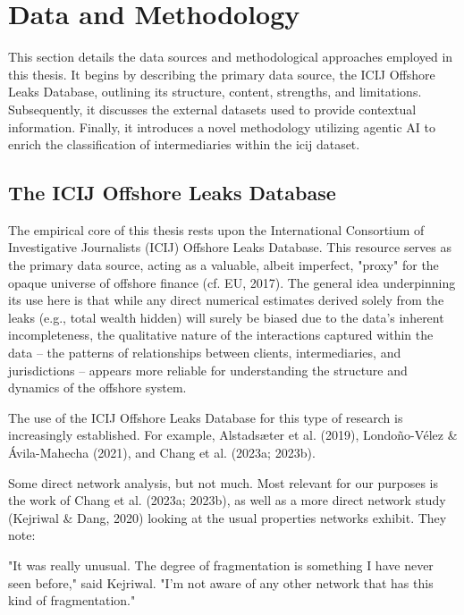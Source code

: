 \chapter{Data and Methodology}
\label{chap:data_methodology}

This section details the data sources and methodological approaches employed in this thesis. It begins by describing the primary data source, the ICIJ Offshore Leaks Database, outlining its structure, content, strengths, and limitations. Subsequently, it discusses the external datasets used to provide contextual information. Finally, it introduces a novel methodology utilizing agentic AI to enrich the classification of intermediaries within the icij dataset.

\section{The ICIJ Offshore Leaks Database}
\label{sec:3_1}

The empirical core of this thesis rests upon the International Consortium of Investigative Journalists (ICIJ) Offshore Leaks Database. This resource serves as the primary data source, acting as a valuable, albeit imperfect, "proxy" for the opaque universe of offshore finance (cf. EU, 2017). The general idea underpinning its use here is that while any direct numerical estimates derived solely from the leaks (e.g., total wealth hidden) will surely be biased due to the data's inherent incompleteness, the qualitative nature of the interactions captured within the data – the patterns of relationships between clients, intermediaries, and jurisdictions – appears more reliable for understanding the structure and dynamics of the offshore system.

The use of the ICIJ Offshore Leaks Database for this type of research is increasingly established. For example, Alstadsæter et al. (2019), Londoño-Vélez \& Ávila-Mahecha (2021), and Chang et al. (2023a; 2023b). 

Some direct network analysis, but not much. Most relevant for our purposes is the work of Chang et al. (2023a; 2023b), as well as a more direct network study (Kejriwal \& Dang, 2020) looking at the usual properties networks exhibit. They note:

"It was really unusual. The degree of fragmentation is something I have never seen before," said Kejriwal. "I'm not aware of any other network that has this kind of fragmentation."

